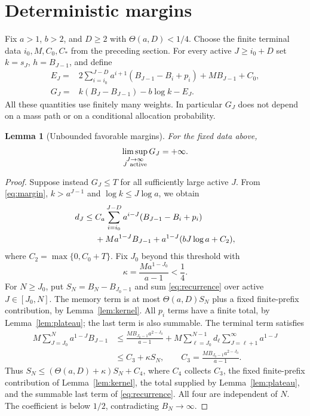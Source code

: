\documentclass[11pt]{amsart}
\newtheorem{lemma}[theorem]{Lemma}
\theoremstyle{remark}\newtheorem{remark}[theorem]{Remark}
\begin{document}
\section{Deterministic margins}\label{sec:margin}
Fix $a>1$, $b>2$, and $D\ge2$ with $\Theta(a,D)<1/4$. Choose the finite
terminal data $i_0,M,C_0,C_*$ from the preceding section. For every active
$J\ge i_0+D$ set $k=s_J$, $h=B_{J-1}$, and define
\begin{align}
 E_J={}&2\sum_{i=i_0}^{J-D}a^{i+1}(B_{J-1}-B_i+p_i)
             +MB_{J-1}+C_0,\label{eq:energy}\\
 G_J={}&k(B_J-B_{J-1})-b\log k-E_J.\label{eq:margin}
\end{align}
All these quantities use finitely many weights. In particular $G_J$ does
not depend on a mass path or on a conditional allocation probability.

\begin{lemma}[Unbounded favorable margins]\label{lem:margin}
For the fixed data above,
\begin{equation}\label{eq:marginlimsup}
 \limsup_{\substack{J\to\infty\\J\ {\rm active}}}G_J=+\infty.
\end{equation}
\end{lemma}

\begin{proof}
Suppose instead $G_J\le T$ for all sufficiently large active $J$.
From \eqref{eq:margin}, $k>a^{J-1}$ and $\log k\le J\log a$, we obtain
\begin{align}
 d_J\le{}&C_a\sum_{i=i_0}^{J-D}a^{i-J}(B_{J-1}-B_i+p_i)\notag\\
 &+Ma^{1-J}B_{J-1}
    +a^{1-J}(bJ\log a+C_2),\label{eq:recurrence}
\end{align}
where $C_2=\max\{0,C_0+T\}$. Fix $J_0$ beyond this threshold with
\begin{equation}\label{eq:kappa}
 \kappa=\frac{Ma^{1-J_0}}{a-1}<\frac14.
\end{equation}
For $N\ge J_0$, put $S_N=B_N-B_{J_0-1}$ and sum
\eqref{eq:recurrence} over active $J\in[J_0,N]$. The memory term is at
most $\Theta(a,D)S_N$ plus a fixed finite-prefix contribution, by
Lemma~\ref{lem:kernel}. All $p_i$ terms have a finite total, by
Lemma~\ref{lem:plateau}; the last term is also summable.
The terminal term satisfies
\begin{align*}
 M\sum_{J=J_0}^N a^{1-J}B_{J-1}
 &\le\frac{MB_{J_0-1}a^{2-J_0}}{a-1}
    +M\sum_{\ell=J_0}^{N-1}d_\ell
                    \sum_{J=\ell+1}^{\infty}a^{1-J}\\
 &\le C_3+\kappa S_N,\qquad C_3=\frac{MB_{J_0-1}a^{2-J_0}}{a-1}.
\end{align*}
Thus $S_N\le(\Theta(a,D)+\kappa)S_N+C_4$, where $C_4$ collects $C_3$, the
fixed finite-prefix contribution of Lemma~\ref{lem:kernel}, the total supplied
by Lemma~\ref{lem:plateau}, and the summable last term of
\eqref{eq:recurrence}. All four are independent of $N$. The coefficient is
below $1/2$, contradicting $B_N\to\infty$.
\end{proof}
\end{document}
